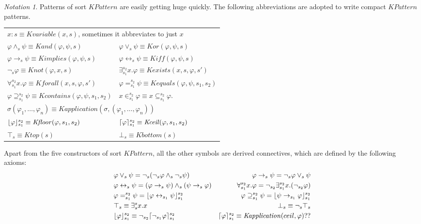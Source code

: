 \documentclass[UTF8]{article}
\newcounter{thmcounter}
\theoremstyle{plain}
\theoremstyle{definition}
\theoremstyle{remark}
\newtheorem{notation}[thmcounter]{Notation}
\newcommand{\cln}{{:}}
\DeclarePairedDelimiter{\ceil}{\lceil}{\rceil}
\DeclarePairedDelimiter{\floor}{\lfloor}{\rfloor}
\newcommand{\KPattern}{\mathit{KPattern}}
\newcommand{\Kvariable}{\mathit{Kvariable}}
\newcommand{\Kand}{\mathit{Kand}}
\newcommand{\Kor}{\mathit{Kor}}
\newcommand{\Kimplies}{\mathit{Kimplies}}
\newcommand{\Kiff}{\mathit{Kiff}}
\newcommand{\Knot}{\mathit{Knot}}
\newcommand{\Kapplication}{\mathit{Kapplication}}
\newcommand{\Kexists}{\mathit{Kexists}}
\newcommand{\Kforall}{\mathit{Kforall}}
\newcommand{\Kequals}{\mathit{Kequals}}
\newcommand{\Kcontains}{\mathit{Kcontains}}
\newcommand{\Ktop}{\mathit{Ktop}}
\newcommand{\Kbottom}{\mathit{Kbottom}}
\newcommand{\Kfloor}{\mathit{Kfloor}}
\newcommand{\Kceil}{\mathit{Kceil}}
\newcommand{\kand}{\wedge}
\newcommand{\kor}{\vee}
\newcommand{\kimplies}{\to}
\newcommand{\kiff}{\leftrightarrow}
\newcommand{\knot}{\neg}
\newcommand{\kexists}{\exists}
\newcommand{\kforall}{\forall}
\newcommand{\kequals}{=}
\newcommand{\kcontains}{\supseteq}
\newcommand{\kfloor}{\floor}
\newcommand{\kceil}{\ceil}
\newcommand{\ktop}{\top}
\newcommand{\kbottom}{\bot}
\begin{document}
\begin{notation}
	Patterns of sort $\KPattern$ are easily getting huge quickly.
	The following abbreviations are adopted to write compact $\KPattern$ patterns.
	\begin{center}
	\begin{tabular}{ll}
    \multicolumn{2}{l}{$x \cln s \equiv \Kvariable(x, s)$, sometimes it abbreviates to just $x$}
  \\
	$\varphi \kand_s \psi \equiv \Kand(\varphi, \psi, s)$
  & $\varphi \kor_s \psi \equiv \Kor(\varphi, \psi, s)$
  \\
    $\varphi \kimplies_s \psi \equiv \Kimplies(\varphi, \psi, s)$
  &	$\varphi \kiff_s \psi \equiv \Kiff(\varphi, \psi, s)$
  \\
    $\knot_s \varphi \equiv \Knot(\varphi, x, s)$
  & $\kexists_{s_1}^{s_2} x . \varphi \equiv \Kexists(x,s,\varphi,s')$
  \\
    $\kforall_{s_1}^{s_2} x . \varphi \equiv \Kforall(x,s,\varphi,s')$
  & $\varphi \kequals_{s_1}^{s_2} \psi \equiv \Kequals(\varphi, \psi, s_1, s_2)$
  \\
    $\varphi \kcontains_{s_1}^{s_2} \psi \equiv \Kcontains(\varphi, \psi, s_1, s_2)$
  & $x \in_{s_1}^{s_2} \varphi \equiv x \subseteq_{s_1}^{s_2} \varphi$.
  \\
    \multicolumn{2}{l}{$\sigma(\varphi_1,\dots,\varphi_n) \equiv \Kapplication(\sigma, (\varphi_1,\dots,\varphi_n))$}
  \\
    $\kfloor{\varphi}_{s_1}^{s_2} \equiv \Kfloor(\varphi, s_1, s_2)$
  & $\kceil{\varphi}_{s_1}^{s_2} \equiv \Kceil(\varphi, s_1, s_2)$
  \\
    $\ktop_s \equiv \Ktop(s)$
  & $\kbottom_s \equiv \Kbottom(s)$
	\end{tabular}
    \end{center}
\end{notation}

Apart from the five constructors of sort $\KPattern$, all the other symbols are derived connectives, which are defined by the following axioms:
\begin{align*}
&\varphi \kor_s \psi = \knot_s(\knot_s \varphi \kand_s \knot_s \psi)
&\varphi \kimplies_s \psi = \knot_s \varphi \kor_s \psi
\\
&\varphi \kiff_s \psi = (\varphi \kimplies_s \psi) \kand_s (\psi \kimplies_s \varphi)
&\kforall_{s_1}^{s_2}x.\varphi = \knot_{s_2} \kexists_{s_1}^{s_2} x. (\knot_{s_2} \varphi)
\\
&\varphi \kequals_{s_1}^{s_2} \psi = \kfloor{\varphi \kiff_{s_1} \psi}_{s_1}^{s_2}
&\varphi \kcontains_{s_1}^{s_2} \psi = \kfloor{\psi \kimplies_{s_1} \varphi}_{s_1}^{s_2}
\\
&\ktop_s \equiv \kexists_s^s x . x
&\kbottom_s \equiv \knot_s \ktop_s
\\
&\kfloor{\varphi}_{s_1}^{s_2} \equiv \knot_{s_2} \kceil{\knot_{s_1} \varphi}_{s_1}^{s_2}
&\kceil{\varphi}_{s_1}^{s_2} \equiv \Kapplication(ceil, \varphi)??
\end{align*}
\end{document}
